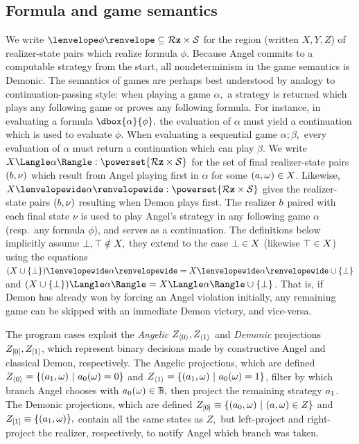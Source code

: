\documentclass[12pt]{cmuthesis}
\theoremstyle{definition}
\theoremstyle{remark}
\newcommand{\allstate}{\mathcal{S}}
\newcommand{\om}{\omega}
\begin{document}
\subsection{Formula and game semantics}
We write $\fintR{\phi} \subseteq \allRz \times \allstate$ for the region (written $X,Y,Z$) of realizer-state pairs which realize formula $\phi$.
Because Angel commits to a computable strategy from the start, all nondeterminism in the game semantics is Demonic.
The semantics of games are perhaps best understood by analogy to continuation-passing style: when playing a game $\alpha,$ a strategy is returned which plays any following game or proves any following formula.
For instance, in evaluating a formula $\dbox{\alpha}{\phi},$ the evaluation of $\alpha$ must yield a continuation which is used to evaluate $\phi$.
When evaluating a sequential game $\alpha;\beta,$ every evaluation of $\alpha$ must return a continuation which can play $\beta$.
We write $\strategyforR[\alpha]{X} : \powerset{\allRz \times \allstate}$ for the set of final realizer-state pairs $(b,\nu)$ which result from Angel playing first in $\alpha$ for some $(\aa,\om) \in X$.
Likewise, $\dstrategyforR[\alpha]{X} : \powerset{\allRz \times \allstate}$ gives the realizer-state pairs $(b,\nu)$ resulting when Demon plays first.
The realizer $b$ paired with each final state $\nu$ is used to play Angel's strategy in any following game $\alpha$ (resp.\ any formula $\phi$), and serves as a continuation.
The definitions below implicitly assume $\bot, \top \notin X,$ they extend to the case $\bot \in X$ (likewise $\top \in X$) using the equations 
$\dstrategyforR[\alpha]{(X \cup \{\sff\})} = \dstrategyforR[\alpha]{X} \cup\{\sff\}$ and 
$\strategyforR[\alpha]{(X \cup \{\sff\})} = \strategyforR[\alpha]{X} \cup\{\sff\}$.
That is, if Demon has already won by forcing an Angel violation initially, any remaining game can be skipped with an immediate Demon victory, and vice-versa.

The program cases exploit the \emph{Angelic} $Z_{\langle{0}\rangle}, Z_{\langle{1}\rangle}$ and \emph{Demonic} projections $Z_{[0]}, Z_{[1]}$, which represent binary decisions made by constructive Angel and classical Demon, respectively.
The Angelic projections, which are defined $\apL{Z} = \{(\rzSnd{\aa}, \om)~|~\rzFst{\aa}(\om)=0\}$ and $\apR{Z} = \{(\rzSnd{\aa}, \om)~|~\rzFst{\aa}(\om)=1\}$, filter by which branch Angel chooses with $\rzFst{\aa}(\om) \in \mathbb{B},$ then project the remaining strategy $a_1$.
The Demonic projections, which are defined $\dpL{Z} \equiv \{(\rzFst{\aa},\om)~|~(\aa,\om) \in Z\}$ and $\dpR{Z} \equiv \{(\rzSnd{\aa},\om)\},$ contain all the same states as $Z,$ but left-project and right-project the realizer, respectively, to notify Angel which branch was taken.
\end{document}
